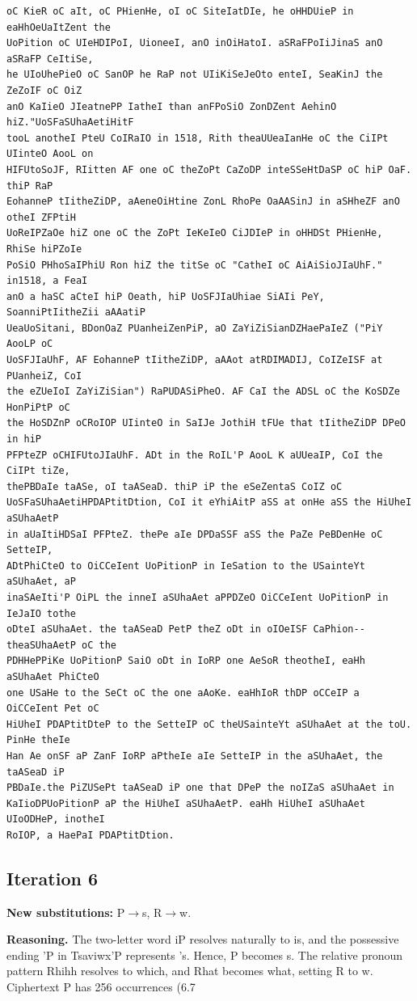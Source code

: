 \documentclass[12pt,a4paper]{article}
\begin{document}
\begin{lstlisting}[caption={Complete text after iteration 5}, label={lst:iter5}]
oC KieR oC aIt, oC PHienHe, oI oC SiteIatDIe, he oHHDUieP in eaHhOeUaItZent the
UoPition oC UIeHDIPoI, UioneeI, anO inOiHatoI. aSRaFPoIiJinaS anO aSRaFP CeItiSe,
he UIoUhePieO oC SanOP he RaP not UIiKiSeJeOto enteI, SeaKinJ the ZeZoIF oC OiZ
anO KaIieO JIeatnePP IatheI than anFPoSiO ZonDZent AehinO hiZ."UoSFaSUhaAetiHitF
tooL anotheI PteU CoIRaIO in 1518, Rith theaUUeaIanHe oC the CiIPt UIinteO AooL on
HIFUtoSoJF, RIitten AF one oC theZoPt CaZoDP inteSSeHtDaSP oC hiP OaF. thiP RaP
EohanneP tIitheZiDP, aAeneOiHtine ZonL RhoPe OaAASinJ in aSHheZF anO otheI ZFPtiH
UoReIPZaOe hiZ one oC the ZoPt IeKeIeO CiJDIeP in oHHDSt PHienHe, RhiSe hiPZoIe
PoSiO PHhoSaIPhiU Ron hiZ the titSe oC "CatheI oC AiAiSioJIaUhF." in1518, a FeaI
anO a haSC aCteI hiP Oeath, hiP UoSFJIaUhiae SiAIi PeY, SoanniPtIitheZii aAAatiP
UeaUoSitani, BDonOaZ PUanheiZenPiP, aO ZaYiZiSianDZHaePaIeZ ("PiY AooLP oC
UoSFJIaUhF, AF EohanneP tIitheZiDP, aAAot atRDIMADIJ, CoIZeISF at PUanheiZ, CoI
the eZUeIoI ZaYiZiSian") RaPUDASiPheO. AF CaI the ADSL oC the KoSDZe HonPiPtP oC
the HoSDZnP oCRoIOP UIinteO in SaIJe JothiH tFUe that tIitheZiDP DPeO in hiP
PFPteZP oCHIFUtoJIaUhF. ADt in the RoIL'P AooL K aUUeaIP, CoI the CiIPt tiZe,
thePBDaIe taASe, oI taASeaD. thiP iP the eSeZentaS CoIZ oC
UoSFaSUhaAetiHPDAPtitDtion, CoI it eYhiAitP aSS at onHe aSS the HiUheI aSUhaAetP
in aUaItiHDSaI PFPteZ. thePe aIe DPDaSSF aSS the PaZe PeBDenHe oC SetteIP,
ADtPhiCteO to OiCCeIent UoPitionP in IeSation to the USainteYt aSUhaAet, aP
inaSAeIti'P OiPL the inneI aSUhaAet aPPDZeO OiCCeIent UoPitionP in IeJaIO tothe
oDteI aSUhaAet. the taASeaD PetP theZ oDt in oIOeISF CaPhion--theaSUhaAetP oC the
PDHHePPiKe UoPitionP SaiO oDt in IoRP one AeSoR theotheI, eaHh aSUhaAet PhiCteO
one USaHe to the SeCt oC the one aAoKe. eaHhIoR thDP oCCeIP a OiCCeIent Pet oC
HiUheI PDAPtitDteP to the SetteIP oC theUSainteYt aSUhaAet at the toU. PinHe theIe
Han Ae onSF aP ZanF IoRP aPtheIe aIe SetteIP in the aSUhaAet, the taASeaD iP
PBDaIe.the PiZUSePt taASeaD iP one that DPeP the noIZaS aSUhaAet in
KaIioDPUoPitionP aP the HiUheI aSUhaAetP. eaHh HiUheI aSUhaAet UIoODHeP, inotheI
RoIOP, a HaePaI PDAPtitDtion.
\end{lstlisting}

\clearpage
\subsection{Iteration 6}
\textbf{New substitutions:} P$\to$s, R$\to$w.

\textbf{Reasoning.} The two-letter word iP resolves naturally to is, and the possessive ending 'P in Tsaviwx'P represents 's. Hence, P becomes s. The relative pronoun pattern Rhihh resolves to which, and Rhat becomes what, setting R to w. Ciphertext P has 256 occurrences (6.7%
\end{document}
